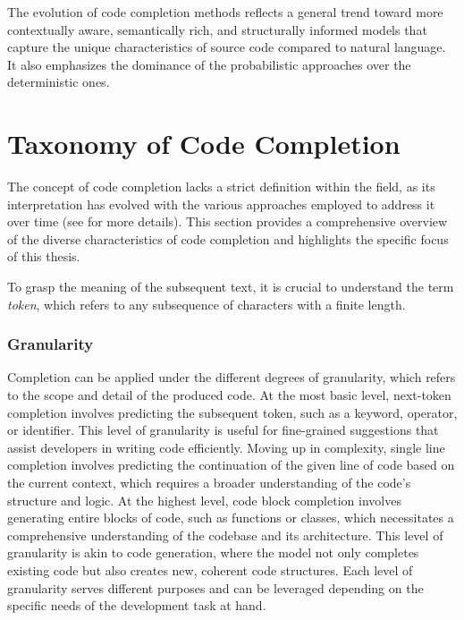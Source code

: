 The evolution of code completion methods reflects a general trend toward more contextually aware, semantically rich, and structurally informed models that capture the unique characteristics of source code compared to natural language. It also emphasizes the dominance of the probabilistic approaches over the deterministic ones.

\section{Taxonomy of Code Completion}

The concept of code completion lacks a strict definition within the field, as its interpretation has evolved with the various approaches employed to address it over time (see  for more details). This section provides a comprehensive overview of the diverse characteristics of code completion and highlights the specific focus of this thesis.

To grasp the meaning of the subsequent text, it is crucial to understand the term \textit{token}, which refers to any subsequence of characters with a finite length.  %

\subsubsection*{Granularity}

Completion can be applied under the different degrees of granularity, which refers to the scope and detail of the produced code. At the most basic level, next-token completion involves predicting the subsequent token, such as a keyword, operator, or identifier. This level of granularity is useful for fine-grained suggestions that assist developers in writing code efficiently. Moving up in complexity, single line completion involves predicting the continuation of the given line of code based on the current context, which requires a broader understanding of the code's structure and logic. At the highest level, code block completion involves generating entire blocks of code, such as functions or classes, which necessitates a comprehensive understanding of the codebase and its architecture. This level of granularity is akin to code generation, where the model not only completes existing code but also creates new, coherent code structures. Each level of granularity serves different purposes and can be leveraged depending on the specific needs of the development task at hand.

